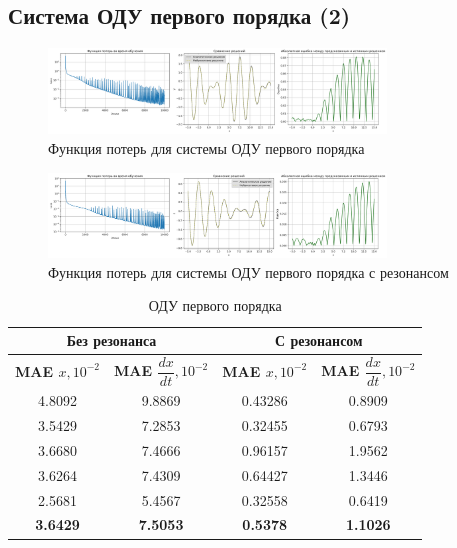 \documentclass[12pt,a4paper]{article}
\begin{document}
\newpage

\subsection{Система ОДУ первого порядка (2)}

\begin{figure}[H]
    \centering
    \includegraphics[width=0.8\textwidth]{images/Loss&x_ODE_of_the_first_order.png}
    \caption{Функция потерь для системы ОДУ первого порядка}
    \label{fig:loss_first_order}
\end{figure}

\begin{figure}[H]
    \centering
    \includegraphics[width=0.8\textwidth]{images/Loss&x_ODE_of_the_first_order_resonance.png}
    \caption{Функция потерь для системы ОДУ первого порядка с резонансом}
    \label{fig:loss_first_order_resonance}
\end{figure}

\begin{table}[h!]
    \centering
    \begin{tabular}{|c|c|c|c|}
    \hline
    \multicolumn{2}{|c|}{\textbf{Без резонанса}} & \multicolumn{2}{|c|}{\textbf{С резонансом}} \\
    \hline
    \textbf{MAE $x, 10^{-2}$} & \textbf{MAE $\dfrac{dx}{dt}, 10^{-2}$} & \textbf{MAE $x, 10^{-2}$} & \textbf{MAE $\dfrac{dx}{dt}, 10^{-2}$} \\
    \hline
    4.8092 & 9.8869 & 0.43286 & 0.8909 \\
    3.5429 & 7.2853 & 0.32455 & 0.6793 \\
    3.6680 & 7.4666 & 0.96157 & 1.9562 \\
    3.6264 & 7.4309 & 0.64427 & 1.3446 \\
    2.5681 & 5.4567 & 0.32558 & 0.6419 \\
    \hline
    \textbf{3.6429} & \textbf{7.5053} & \textbf{0.5378} & \textbf{1.1026} \\
    \hline
    \end{tabular}
    \caption{ОДУ первого порядка}
\end{table}
\end{document}
